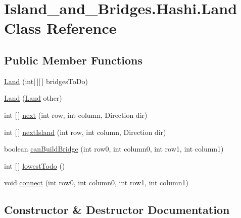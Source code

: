 \hypertarget{class_island__and___bridges_1_1_hashi_1_1_land}{}\section{Island\+\_\+and\+\_\+\+Bridges.\+Hashi.\+Land Class Reference}
\label{class_island__and___bridges_1_1_hashi_1_1_land}
\subsection*{Public Member Functions}
\begin{DoxyCompactItemize}
\item 
\mbox{\hyperlink{class_island__and___bridges_1_1_hashi_1_1_land_a63f13f2c5b145d6b7ae7044e8c56e365}{Land}} (int\mbox{[}$\,$\mbox{]}\mbox{[}$\,$\mbox{]} bridges\+To\+Do)
\item 
\mbox{\hyperlink{class_island__and___bridges_1_1_hashi_1_1_land_aab6b767be9b8a199ce3bc0929c53b4c9}{Land}} (\mbox{\hyperlink{class_island__and___bridges_1_1_hashi_1_1_land}{Land}} other)
\item 
int \mbox{[}$\,$\mbox{]} \mbox{\hyperlink{class_island__and___bridges_1_1_hashi_1_1_land_a2a665d37b80c351081b51f727b575c10}{next}} (int row, int column, Direction dir)
\item 
int \mbox{[}$\,$\mbox{]} \mbox{\hyperlink{class_island__and___bridges_1_1_hashi_1_1_land_a0a24f0dc5ed35f61803817ae39e274d9}{next\+Island}} (int row, int column, Direction dir)
\item 
boolean \mbox{\hyperlink{class_island__and___bridges_1_1_hashi_1_1_land_a8d37542dbb0c90853d6f2e2b4ddfb63f}{can\+Build\+Bridge}} (int row0, int column0, int row1, int column1)
\item 
int \mbox{[}$\,$\mbox{]} \mbox{\hyperlink{class_island__and___bridges_1_1_hashi_1_1_land_a73371f6d163719867627e5953ae35d7d}{lowest\+Todo}} ()
\item 
void \mbox{\hyperlink{class_island__and___bridges_1_1_hashi_1_1_land_a053ead3b743dce070d270efd9ab39de7}{connect}} (int row0, int column0, int row1, int column1)
\end{DoxyCompactItemize}


\subsection{Constructor \& Destructor Documentation}
\mbox{\label{class_island__and___bridges_1_1_hashi_1_1_land_a63f13f2c5b145d6b7ae7044e8c56e365}} 
